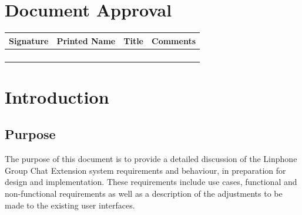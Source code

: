 \documentclass[11pt]{article}
\begin{document}
\section{Document Approval}
\begin{table}[h]
\begin{tabular}{llll}
\textbf{Signature}     & \textbf{Printed Name} & \textbf{Title}        & \textbf{Comments}     \\ \hline
\multicolumn{1}{|l|}{} & \multicolumn{1}{L{4.5cm}|}{} & \multicolumn{1}{L{4cm}|}{} & \multicolumn{1}{L{4cm}|}{} \\ \hline
\multicolumn{1}{|l|}{} & \multicolumn{1}{l|}{} & \multicolumn{1}{l|}{} & \multicolumn{1}{l|}{} \\ \hline
\multicolumn{1}{|l|}{} & \multicolumn{1}{l|}{} & \multicolumn{1}{l|}{} & \multicolumn{1}{l|}{} \\ \hline
\multicolumn{1}{|l|}{} & \multicolumn{1}{l|}{} & \multicolumn{1}{l|}{} & \multicolumn{1}{l|}{} \\ \hline
\end{tabular}
\end{table}

\newpage
\section{Introduction}

\subsection{Purpose}
The purpose of this document is to provide a detailed discussion of the Linphone Group Chat Extension system requirements and behaviour, in preparation for design and implementation. These requirements include use cases, functional and non-functional requirements as well as a description of the adjustments to be made to the existing user interfaces.
\end{document}
